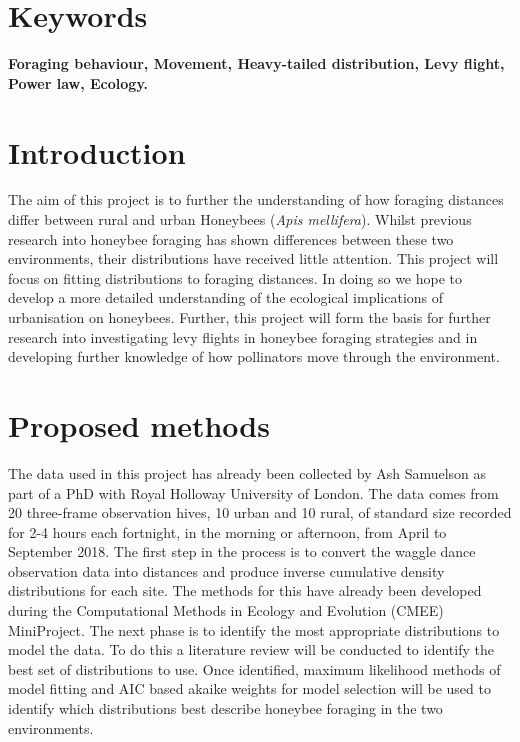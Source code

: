 \documentclass[11pt,usenames,dvipsnames]{article}
\begin{document}
\section{Keywords}

\textbf{Foraging behaviour, Movement, Heavy-tailed distribution, Levy flight, Power law, Ecology.}

\section{Introduction}
The aim of this project is to further the understanding of how foraging distances differ between rural and urban Honeybees (\textit{Apis mellifera}). Whilst previous research into honeybee foraging has shown differences between these two environments, their distributions have received little attention. This project will focus on fitting distributions to foraging distances. In doing so we hope to develop a more detailed understanding of the ecological implications of urbanisation on honeybees. Further, this project will form the basis for further research into investigating levy flights in honeybee foraging strategies and in developing further knowledge of how pollinators move through the environment. 

\section{Proposed methods}
The data used in this project has already been collected by Ash Samuelson as part of a PhD with Royal Holloway University of London. The data comes from 20 three-frame observation hives, 10 urban and 10 rural, of standard size recorded for 2-4 hours each fortnight, in the morning or afternoon, from April to September 2018. The first step in the process is to convert the waggle dance observation data into distances and produce inverse cumulative density distributions for each site. The methods for this have already been developed during the Computational Methods in Ecology and Evolution (CMEE) MiniProject. The next phase is to identify the most appropriate distributions to model the data. To do this a literature review will be conducted to identify the best set of distributions to use. Once identified, maximum likelihood methods of model fitting and AIC based akaike weights for model selection will be used to identify which distributions best describe honeybee foraging in the two environments.
\end{document}

